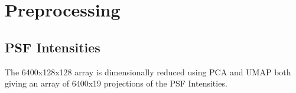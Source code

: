 \section{Preprocessing}

	\subsection{PSF Intensities}
		The 6400x128x128 array is dimensionally reduced using PCA and UMAP both giving an array of 6400x19 projections of the PSF Intensities.